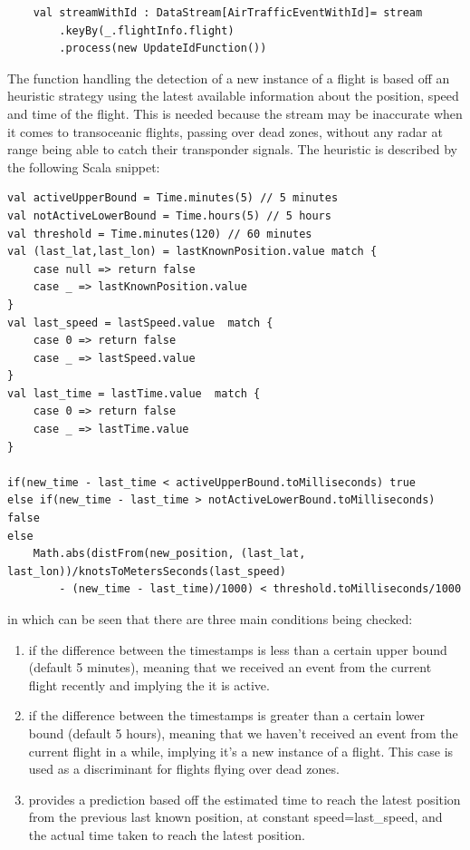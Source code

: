 \begin{code}
    \begin{verbatim}
    val streamWithId : DataStream[AirTrafficEventWithId]= stream
        .keyBy(_.flightInfo.flight)
        .process(new UpdateIdFunction())
    \end{verbatim}
\end{code}
\pagebreak
The function handling the detection of a new instance of a flight is based off an heuristic strategy using the latest available information about the position, speed and time of the flight. This is needed because the stream may be inaccurate when it comes to transoceanic flights, passing over dead zones, without any radar at range being able to catch their transponder signals. The heuristic is described by the following Scala snippet:
\\
\begin{verbatim}
val activeUpperBound = Time.minutes(5) // 5 minutes
val notActiveLowerBound = Time.hours(5) // 5 hours
val threshold = Time.minutes(120) // 60 minutes
val (last_lat,last_lon) = lastKnownPosition.value match {
    case null => return false
    case _ => lastKnownPosition.value
}
val last_speed = lastSpeed.value  match {
    case 0 => return false
    case _ => lastSpeed.value
}
val last_time = lastTime.value  match {
    case 0 => return false
    case _ => lastTime.value
}

if(new_time - last_time < activeUpperBound.toMilliseconds) true
else if(new_time - last_time > notActiveLowerBound.toMilliseconds) false
else
    Math.abs(distFrom(new_position, (last_lat, last_lon))/knotsToMetersSeconds(last_speed)
        - (new_time - last_time)/1000) < threshold.toMilliseconds/1000

\end{verbatim}

in which can be seen that there are three main conditions being checked:
\begin{enumerate}
    \item if the difference between the timestamps is less than a certain upper bound (default 5 minutes), meaning that we received an event from the current flight recently and implying the it is active.
    \item if the difference between the timestamps is greater than a certain lower bound (default 5 hours), meaning that we haven't received an event from the current flight in a while, implying it's a new instance of a flight. This case is used as a discriminant for flights flying over dead zones.
    \item provides a prediction based off the estimated time to reach the latest position from the previous last known position, at constant speed=last\_speed, and the actual time taken to reach the latest position.
\end{enumerate}

